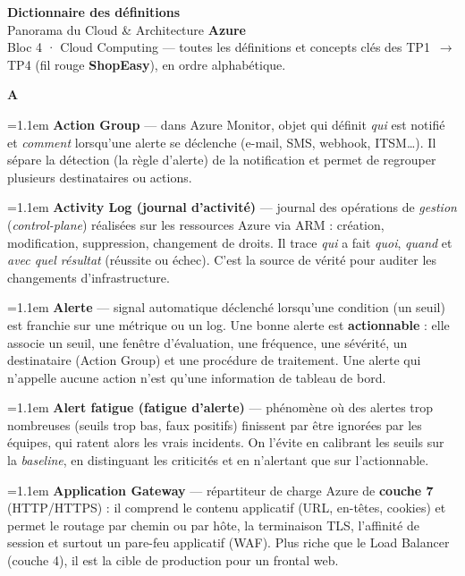\documentclass[11pt,a4paper]{article}
\newcommand{\arr}{\,$\rightarrow$\,}
\newcommand{\lettre}[1]{%
  \par\addvspace{9pt}\needspace{4.5\baselineskip}%
  \markright{#1}%
  {\noindent\sffamily\bfseries\Large\color{azure}#1}%
  \nobreak\vspace{0.4mm}{\color{azure!45}\hrule height 1pt}\nobreak\vspace{3mm}\par}
\newcommand{\df}[2]{%
  \par\addvspace{4pt}\needspace{2\baselineskip}%
  \hangindent=1.1em\hangafter=1
  {\sffamily\bfseries\color{azuredark}#1} — #2\par}
\begin{document}
\thispagestyle{fancy}
\noindent\colorbox{azuredark}{%
  \parbox{\dimexpr\linewidth-2\fboxsep\relax}{%
    \sffamily\color{white}\vspace{1.6mm}
    {\bfseries\LARGE Dictionnaire des définitions}\\[1mm]
    {\large Panorama du Cloud \& Architecture \textbf{Azure}}\\[1.4mm]
    {\footnotesize\color{white!85} Bloc 4 · Cloud Computing — toutes les définitions et concepts clés des TP1 \arr{} TP4 (fil rouge \textbf{ShopEasy}), en ordre alphabétique.}
    \vspace{1.6mm}}}

\vspace{4mm}

\lettre{A}

\df{Action Group}{dans Azure Monitor, objet qui définit \emph{qui} est notifié et \emph{comment} lorsqu'une alerte se déclenche (e-mail, SMS, webhook, ITSM\dots). Il sépare la détection (la règle d'alerte) de la notification et permet de regrouper plusieurs destinataires ou actions.}

\df{Activity Log (journal d'activité)}{journal des opérations de \emph{gestion} (\emph{control-plane}) réalisées sur les ressources Azure via ARM : création, modification, suppression, changement de droits. Il trace \emph{qui} a fait \emph{quoi}, \emph{quand} et \emph{avec quel résultat} (réussite ou échec). C'est la source de vérité pour auditer les changements d'infrastructure.}

\df{Alerte}{signal automatique déclenché lorsqu'une condition (un seuil) est franchie sur une métrique ou un log. Une bonne alerte est \textbf{actionnable} : elle associe un seuil, une fenêtre d'évaluation, une fréquence, une sévérité, un destinataire (Action Group) et une procédure de traitement. Une alerte qui n'appelle aucune action n'est qu'une information de tableau de bord.}

\df{Alert fatigue (fatigue d'alerte)}{phénomène où des alertes trop nombreuses (seuils trop bas, faux positifs) finissent par être ignorées par les équipes, qui ratent alors les vrais incidents. On l'évite en calibrant les seuils sur la \emph{baseline}, en distinguant les criticités et en n'alertant que sur l'actionnable.}

\df{Application Gateway}{répartiteur de charge Azure de \textbf{couche 7} (HTTP/HTTPS) : il comprend le contenu applicatif (URL, en-têtes, cookies) et permet le routage par chemin ou par hôte, la terminaison TLS, l'affinité de session et surtout un pare-feu applicatif (WAF). Plus riche que le Load Balancer (couche 4), il est la cible de production pour un frontal web.}
\end{document}

